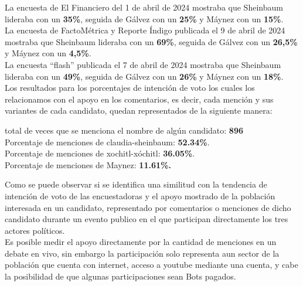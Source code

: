 La encuesta de El Financiero del 1 de abril de 2024 mostraba que Sheinbaum lideraba con un \textbf{35\%}, seguida de Gálvez con un \textbf{25\%} y Máynez con un \textbf{15\%}.\\


La encuesta de FactoMétrica y Reporte Índigo publicada el 9 de abril de 2024 mostraba que Sheinbaum lideraba con un \textbf{69\%}, seguida de Gálvez con un \textbf{26,5\%} y Máynez con un \textbf{4,5\%}.\\


La encuesta “flash” publicada el 7 de abril de 2024 mostraba que Sheinbaum lideraba con un \textbf{49\%}, seguida de Gálvez con un \textbf{26\%} y Máynez con un \textbf{18\%}.\\

Los resultados para los porcentajes de intención de voto los cuales los relacionamos con el apoyo en los comentarios, es decir, cada mención y sus variantes de cada candidato, quedan representados de la siguiente manera:\\

\begin{center}
	total de veces que se menciona el nombre de algún candidato:  \textbf{896}\\

Porcentaje de menciones de claudia-sheinbaum: \textbf{52.34\%}.\\

Porcentaje de menciones de xochitl-xóchitl: \textbf{36.05\%}.\\

Porcentaje de menciones de Maynez: \textbf{11.61\%.}

\end{center}

Como se puede observar si se identifica una similitud con la tendencia de intención de voto de las encuestadoras y el apoyo mostrado de la población interesada en un candidato, representado por comentarios o menciones de dicho candidato durante un evento publico en el que participan directamente los tres actores políticos.\\

Es posible medir el apoyo directamente por la cantidad de menciones en un debate en vivo, sin embargo la participación solo representa aun sector de la población que cuenta con internet, acceso a youtube mediante una cuenta, y cabe la posibilidad de que algunas participaciones sean Bots pagados.\\
